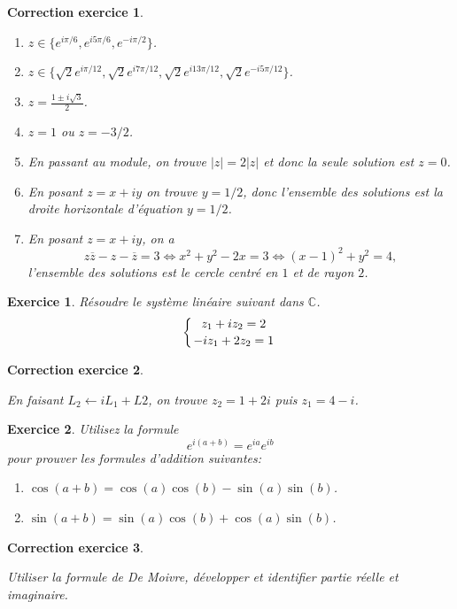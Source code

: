 \documentclass[12pt]{article}
\newtheorem{exercice}{\bf Exercice}
\newtheorem{correction}{\bf Correction exercice}
\newenvironment{exo}{
\begin{exercice}\smallskip\normalfont}{\end{exercice}
}
\newenvironment{cor}{
\begin{correction}\smallskip\normalfont}{\end{correction}
}
\newif\ifcorrige\corrigetrue
\begin{document}
   \ifcorrige
\color{magenta}
\begin{cor}
  $\qquad$
\begin{enumerate}
\item $z \in \{ e^{i\pi/6}, e^{i5\pi/6}, e^{-i\pi/2}  \}$.
\item $z \in \{\sqrt{2}e^{i\pi/12}, \sqrt{2}e^{i7\pi/12},   \sqrt{2}e^{i13\pi/12},  \sqrt{2}e^{-i5\pi/12}   \}$.
\item $z=\frac{1\pm i\sqrt{3}}{2}$.
\item $z=1$ ou $z=-3/2$.
\item En passant au module, on trouve $\vert z\vert=2\vert z\vert$ et donc la seule solution est $z=0$.
\item En posant $z=x+iy$ on trouve $y=1/2$, donc l'ensemble des solutions est la droite horizontale d'\'equation $y=1/2$.
\item En posant $z=x+iy$, on a
$$z\overline{z}-z-\overline{z}=3 \Leftrightarrow  x^2+y^2-2x=3 \Leftrightarrow (x-1)^2+y^2=4,$$
l'ensemble des solutions est le cercle centr\'e en $1$ et de rayon $2$.
\end{enumerate}
\end{cor}
\color{black}
\fi

 
 
 
 \begin{exo}
 R\'esoudre le syst\`eme lin\'eaire suivant dans $\mathbb{C}$.
 $$\left \{ z_1+iz_2=2 \atop -iz_1+2z_2=1       \right.$$
 \end{exo}
 
    \ifcorrige
\color{magenta}
\begin{cor}
  $\qquad$

En faisant $L_2 \leftarrow iL_1+L2$, on trouve $z_2=1+2i$ puis $z_1=4-i$.
\end{cor}
\color{black}
\fi

 
 
 
 \begin{exo}
  Utilisez la formule 
  $$e^{i(a+b)}=e^{ia} e^{ib}$$ 
  pour prouver les formules d'addition suivantes:
  \begin{enumerate}
   \item $\cos(a+b)=\cos(a)\cos(b)-\sin(a)\sin(b)$.
   \item $\sin(a+b)=\sin(a)\cos(b)+\cos(a)\sin(b)$.
  \end{enumerate}
 \end{exo}
 
    \ifcorrige
\color{magenta}
\begin{cor}
  $\qquad$
  
Utiliser la formule de De Moivre, d\'evelopper et identifier partie r\'eelle et imaginaire.
\end{cor}
\color{black}
\fi
\end{document}
